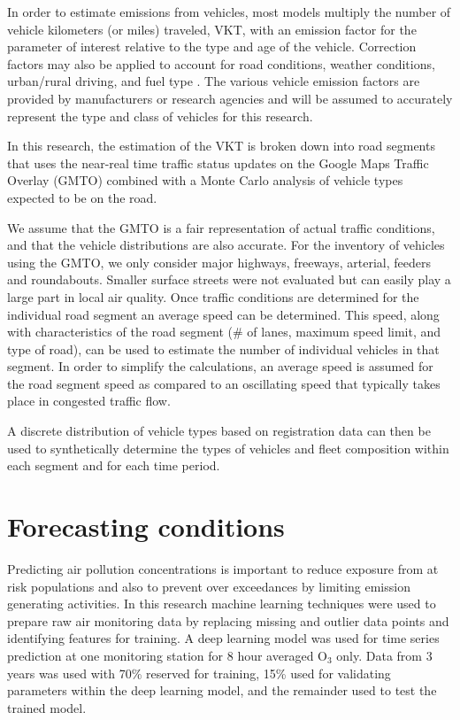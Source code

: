 In order to estimate emissions from vehicles, most models multiply the number of vehicle kilometers (or miles) traveled, VKT, with an emission factor for the parameter of interest relative to the type and age of the vehicle. Correction factors may also be applied to account for road conditions, weather conditions, urban/rural driving, and fuel type \citep{IVE2008}. The various vehicle emission factors are provided by manufacturers or research agencies and will be assumed to accurately represent the type and class of vehicles for this research.

In this research, the estimation of the VKT is broken down into road segments that uses the near-real time traffic status updates on the Google Maps Traffic Overlay (GMTO) combined with a Monte Carlo analysis of vehicle types expected to be on the road. 

We assume that the GMTO is a fair representation of actual traffic conditions, and that the vehicle distributions are also accurate. For the inventory of vehicles using the GMTO, we only consider major highways, freeways, arterial, feeders and roundabouts. Smaller surface streets were not evaluated but can easily play a large part in local air quality. Once traffic conditions are determined for the individual road segment an average speed can be determined. This speed, along with characteristics of the road segment (\# of lanes, maximum speed limit, and type of road), can be used to estimate the number of individual vehicles in that segment. In order to simplify the calculations, an average speed is assumed for the road segment speed as compared to an oscillating speed that typically takes place in congested traffic flow.

A discrete distribution of vehicle types based on registration data can then be used to synthetically determine the types of vehicles and fleet composition within each segment and for each time period.



\section{Forecasting conditions}

Predicting air pollution concentrations is important to reduce exposure from at risk populations and also to prevent over exceedances by limiting emission generating activities. In this research machine learning techniques were used to prepare raw air monitoring data by replacing missing and outlier data points and identifying features for training. A deep learning model was used for time series prediction at one monitoring station for 8 hour averaged O$_{3}$ only.  Data from 3 years was used with 70\% reserved for training, 15\% used for validating parameters within the deep learning model, and the remainder used to test the trained model.

